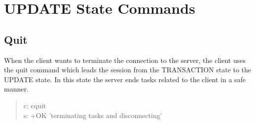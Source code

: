\documentclass[a4paper,11pt]{article}
\begin{document}
\section{UPDATE State Commands}
\subsection{Quit}
When the client wants to terminate the connection to the server, the client uses the quit command which leads the session from the TRANSACTION state to the UPDATE state. In this state the server ends tasks related to the client in a safe manner.

\begin{quote}
  c: cquit\\
  s: +OK 'terminating tasks and disconnecting'
\end{quote}
\end{document}
